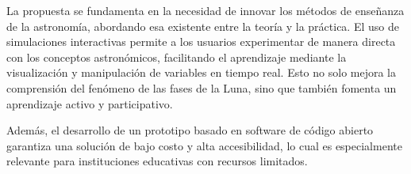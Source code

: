 La propuesta se fundamenta en la necesidad de innovar los métodos de enseñanza de la astronomía, abordando esa existente entre la teoría y la práctica. El uso de simulaciones interactivas permite a los usuarios experimentar de manera directa con los conceptos astronómicos, facilitando el aprendizaje mediante la visualización y manipulación de variables en tiempo real. Esto no solo mejora la comprensión del fenómeno de las fases de la Luna, sino que también fomenta un aprendizaje activo y participativo.

Además, el desarrollo de un prototipo basado en software de código abierto garantiza una solución de bajo costo y alta accesibilidad, lo cual es especialmente relevante para instituciones educativas con recursos limitados. 